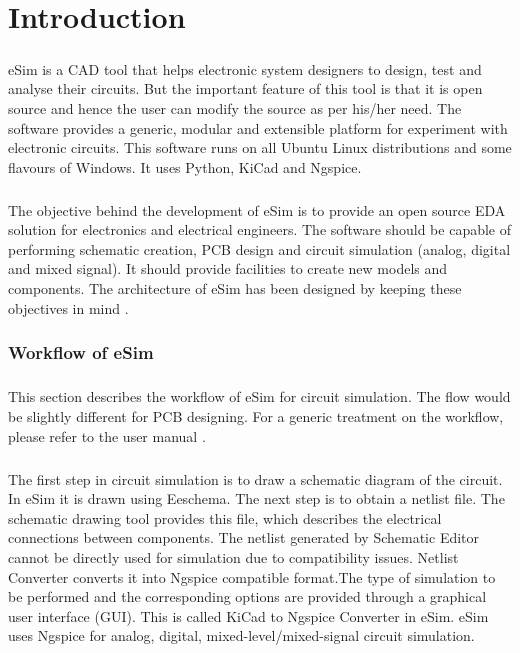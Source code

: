 \chapter{Introduction}

\paragraph{}eSim is a CAD tool that helps electronic system designers to design, test and analyse
their circuits. But the important feature of this tool is that it is open source and hence
the user can modify the source as per his/her need. The software provides a generic,
modular and extensible platform for experiment with electronic circuits. This software
runs on all Ubuntu Linux distributions and some flavours of Windows. It uses Python,
KiCad and Ngspice.

\paragraph{}

The objective behind the development of eSim is to provide an open source EDA
solution for electronics and electrical engineers. The software should be capable of
performing schematic creation, PCB design and circuit simulation (analog, digital and
mixed signal). It should provide facilities to create new models and components. The
architecture of eSim has been designed by keeping these objectives in mind \cite{esimusermanual} .

\subsection{Workflow of eSim}
\paragraph{}

This section describes the workflow of eSim for circuit simulation. The flow would be slightly different for PCB designing. For a generic treatment on the workflow, please refer to the user manual .

\paragraph{}

The first step in circuit simulation is to draw a schematic diagram of the circuit. In eSim it is drawn using Eeschema. The next step is to obtain a netlist file. The schematic drawing tool provides this file, which describes the electrical connections between components.
The netlist generated by Schematic Editor cannot be directly used for simulation due to compatibility issues. Netlist Converter converts it into Ngspice compatible format.The type of simulation to be performed and the corresponding options are provided through a graphical user interface (GUI). This is called KiCad to Ngspice Converter in eSim. 
eSim uses Ngspice for analog, digital, mixed-level/mixed-signal circuit simulation.


